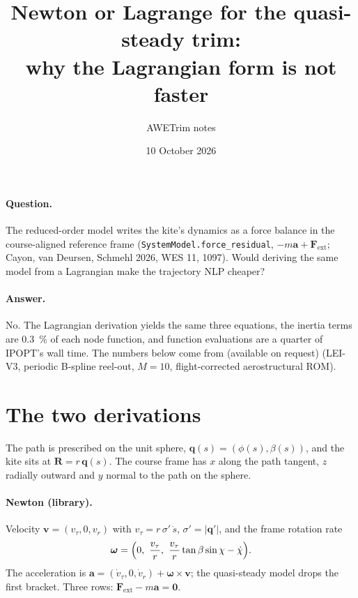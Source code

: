 \documentclass[11pt,a4paper]{article}
\title{Newton or Lagrange for the quasi-steady trim:\\ why the Lagrangian form is not faster}
\author{AWETrim notes}
\date{10 October 2026}
\newcommand{\code}[1]{\texttt{#1}}
\newcommand{\vect}[1]{\boldsymbol{#1}}
\begin{document}
\maketitle

\paragraph{Question.} The reduced-order model writes the kite's dynamics as a
force balance in the course-aligned reference frame
(\code{SystemModel.force\_residual}, $-m\vect a + \vect F_\mathrm{ext}$; Cayon,
van Deursen, Schmehl 2026, WES 11, 1097). Would deriving the same model from a
Lagrangian make the trajectory NLP cheaper?

\paragraph{Answer.} No. The Lagrangian derivation yields the same three
equations, the inertia terms are \SI{0.3}{\percent} of each node function, and
function evaluations are a quarter of IPOPT's wall time. The numbers below come
from  (available on request)
(LEI-V3, periodic B-spline reel-out, $M=10$, flight-corrected aerostructural
ROM).

\section{The two derivations}

The path is prescribed on the unit sphere, $\vect q(s) = (\phi(s), \beta(s))$,
and the kite sits at $\vect R = r\,\vect q(s)$. The course frame has $x$ along
the path tangent, $z$ radially outward and $y$ normal to the path on the sphere.

\paragraph{Newton (library).} Velocity $\vect v = (v_\tau, 0, v_r)$ with
$v_\tau = r\,\sigma'\,\dot s$, $\sigma' = |\vect q'|$, and the frame rotation
rate
\begin{equation}
  \vect\omega = \Bigl(0,\ \frac{v_\tau}{r},\ \frac{v_\tau}{r}\tan\beta\sin\chi - \dot\chi\Bigr).
\end{equation}
The acceleration is $\vect a = (\dot v_\tau, 0, \dot v_r) + \vect\omega\times\vect v$;
the quasi-steady model drops the first bracket. Three rows:
$\vect F_\mathrm{ext} - m\vect a = \vect 0$.
\end{document}
